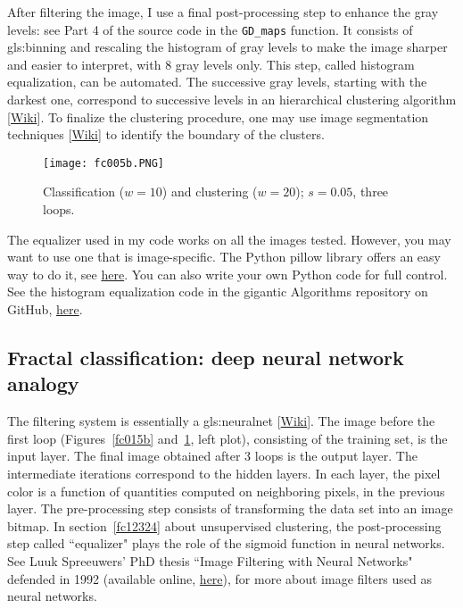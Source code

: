 \documentclass[oneside,10pt]{book}
\begin{document}
After filtering the image, I use a final post-processing step to enhance the gray levels: see Part 4 of the source code in the \texttt{GD\_maps} function. It  consists of \gls{gls:binning} and rescaling the histogram of gray levels to make the image sharper and easier to interpret, with 8 gray levels only. This step, called
\textcolor{index}{histogram equalization},  can be automated. The successive gray levels, starting with the darkest one, correspond to successive levels in an
\textcolor{index}{hierarchical clustering} algorithm [\href{https://en.wikipedia.org/wiki/Hierarchical_clustering}{Wiki}]. To finalize the clustering procedure, one may use \textcolor{index}{image segmentation} techniques [\href{https://en.wikipedia.org/wiki/Image_segmentation}{Wiki}] to identify the boundary of the clusters.

\begin{figure}[H]
\centering
\texttt{[image: fc005b.PNG]}
\caption{Classification ($w=10$) and clustering ($w=20$); $s=0.05$, three loops.}
\label{fc005b}
\end{figure}

The equalizer used in my code works on all the images tested. However, you may want to use one that is image-specific. The Python pillow library offers an easy way to do it, see
\href{https://www.geeksforgeeks.org/python-pil-imageops-equalize-method/}{here}. You can also write your own Python code for full control. See the histogram equalization
 code in the gigantic Algorithms repository on GitHub, \href{https://github.com/TheAlgorithms/Python/blob/master/digital_image_processing/histogram_equalization/histogram_stretch.py}{here}.


\subsection{Fractal classification: deep neural network analogy}\label{fcfract}



The filtering system is essentially a \gls{gls:neuralnet} [\href{https://en.wikipedia.org/wiki/Neural_network}{Wiki}]. The image before the first loop (Figures~\ref{fc015b} and~\ref{fc005b}, left plot), consisting of the training set,  is the input layer. The final image obtained after 3 loops
is the output layer. The intermediate iterations correspond to the \textcolor{index}{hidden layers}. In each layer, the pixel color is a function of quantities computed on neighboring pixels, in the previous layer.
The pre-processing step consists of transforming the data set into an image bitmap. In section~\ref{fc12324} about unsupervised clustering, the post-processing step called ``equalizer" plays the role of the sigmoid function in neural networks.
 See Luuk Spreeuwers' PhD thesis ``Image Filtering with Neural Networks" defended in 1992 \cite{luuk} (available online, \href{https://ris.utwente.nl/ws/portalfiles/portal/255169420/Thesis_L_Spreeuwers.pdf}{here}), for more about image filters used as neural networks.
\end{document}
